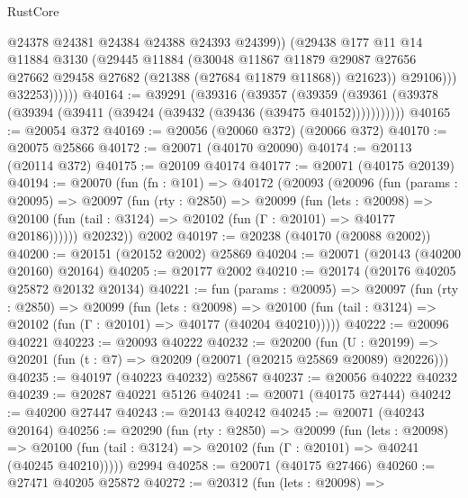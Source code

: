 \begin{lexlean}{RustCore}
\begin{coremodule}
                        @24378
                        @24381
                        @24384
                        @24388
                        @24393
                        @24399))
                    (@29438
                      @177
                      @11
                      @14
                      @11884
                      @3130
                      (@29445
                        @11884
                        (@30048
                          @11867
                          @11879
                          @29087
                          @27656
                          @27662
                          @29458
                          @27682
                          (@21388 (@27684 @11879 @11868))
                          @21623))
                      @29106)))
                @32253))))))
@40164 := @39291
    (@39316
      (@39357
        (@39359 (@39361 (@39378 (@39394 (@39411 (@39424 (@39432 (@39436 (@39475 @40152)))))))))))
@40165 := @20054 @372
@40169 := @20056 (@20060 @372) (@20066 @372)
@40170 := @20075 @25866
@40172 := @20071 (@40170 @20090)
@40174 := @20113 (@20114 @372)
@40175 := @20109 @40174
@40177 := @20071 (@40175 @20139)
@40194 := @20070
    (fun (fn : @101) =>
    @40172
      (@20093
        (@20096
          (fun (params : @20095) =>
          @20097
            (fun (rty : @2850) =>
            @20099
              (fun (lets : @20098) =>
              @20100 (fun (tail : @3124) => @20102 (fun (Γ : @20101) => @40177 @20186))))))
        @20232))
    @2002
@40197 := @20238 (@40170 (@20088 @2002))
@40200 := @20151 (@20152 @2002) @25869
@40204 := @20071 (@20143 (@40200 @20160) @20164)
@40205 := @20177 @2002
@40210 := @20174 (@20176 @40205 @25872 @20132 @20134)
@40221 := fun (params : @20095) =>
  @20097
    (fun (rty : @2850) =>
    @20099
      (fun (lets : @20098) =>
      @20100 (fun (tail : @3124) => @20102 (fun (Γ : @20101) => @40177 (@40204 @40210)))))
@40222 := @20096 @40221
@40223 := @20093 @40222
@40232 := @20200
    (fun (U : @20199) => @20201 (fun (t : @7) => @20209 (@20071 (@20215 @25869 @20089) @20226)))
@40235 := @40197 (@40223 @40232) @25867
@40237 := @20056 @40222 @40232
@40239 := @20287 @40221 @5126
@40241 := @20071 (@40175 @27444)
@40242 := @40200 @27447
@40243 := @20143 @40242
@40245 := @20071 (@40243 @20164)
@40256 := @20290
    (fun (rty : @2850) =>
    @20099
      (fun (lets : @20098) =>
      @20100 (fun (tail : @3124) => @20102 (fun (Γ : @20101) => @40241 (@40245 @40210)))))
    @2994
@40258 := @20071 (@40175 @27466)
@40260 := @27471 @40205 @25872
@40272 := @20312
    (fun (lets : @20098) =>

\end{coremodule}
\end{lexlean}
